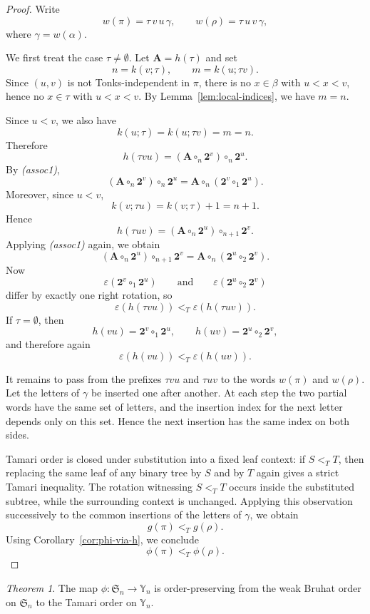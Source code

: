 \documentclass[a4paper]{article}
\theoremstyle{plain}
\theoremstyle{definition}
\theoremstyle{remark}
\numberwithin{equation}{section}
\newcommand{\Sym}{\mathfrak{S}}
\newcommand{\Y}{\mathbb{Y}}
\newcommand{\eval}{\varepsilon}
\newtheorem{theorem}{Theorem}[section]
\begin{document}
\begin{proof}
Write
\[
w(\pi)=\tau\,v\,u\,\gamma,
\qquad
w(\rho)=\tau\,u\,v\,\gamma,
\]
where \(\gamma=w(\alpha)\).

We first treat the case \(\tau\neq\emptyset\). Let $\mathbf A=h(\tau)$ and set
\[
n=k(v;\tau),
\qquad
m=k(u;\tau v).
\]
Since \((u,v)\) is not Tonks-independent in \(\pi\), there is no \(x\in\beta\) with
\(u<x<v\), hence no \(x\in\tau\) with \(u<x<v\). By
Lemma~\ref{lem:local-indices}, we have \(m=n\).

Since \(u<v\), we also have
\[
k(u;\tau)=k(u;\tau v)=m=n.
\]
Therefore
\[
h(\tau v u)=(\mathbf A\circ_n \mathbf 2^v)\circ_n \mathbf 2^u.
\]
By \emph{(assoc1)},
\[
(\mathbf A\circ_n \mathbf 2^v)\circ_n \mathbf 2^u
=
\mathbf A\circ_n(\mathbf 2^v\circ_1 \mathbf 2^u).
\]
Moreover, since \(u<v\),
\[
k(v;\tau u)=k(v;\tau)+1=n+1.
\]
Hence
\[
h(\tau u v)=(\mathbf A\circ_n \mathbf 2^u)\circ_{n+1}\mathbf 2^v.
\]
Applying \emph{(assoc1)} again, we obtain
\[
(\mathbf A\circ_n \mathbf 2^u)\circ_{n+1}\mathbf 2^v
=
\mathbf A\circ_n(\mathbf 2^u\circ_2 \mathbf 2^v).
\]
Now
\[
\eval(\mathbf 2^v\circ_1 \mathbf 2^u)
\qquad\text{and}\qquad
\eval(\mathbf 2^u\circ_2 \mathbf 2^v)
\]
differ by exactly one right rotation, so
\[
\eval(h(\tau v u))<_T \eval(h(\tau u v)).
\]
If \(\tau=\emptyset\), then
\[
h(vu)=\mathbf 2^v\circ_1 \mathbf 2^u,
\qquad
h(uv)=\mathbf 2^u\circ_2 \mathbf 2^v,
\]
and therefore again
\[
\eval(h(vu))<_T \eval(h(uv)).
\]

It remains to pass from the prefixes \(\tau vu\) and \(\tau uv\) to the
words \(w(\pi)\) and \(w(\rho)\). Let the letters of \(\gamma\) be inserted one
after another. At each step the two partial words have the same set of letters,
and the insertion index for the next letter depends only on this set. Hence
the next insertion has the same index on both sides.

Tamari order is closed under substitution into a fixed leaf context: if
\(S<_T T\), then replacing the same leaf of any binary tree by \(S\) and by
\(T\) again gives a strict Tamari inequality. The rotation witnessing
\(S<_T T\) occurs inside the substituted subtree, while the surrounding context
is unchanged. Applying this observation successively to the common insertions
of the letters of \(\gamma\), we obtain
\[
g(\pi)<_T g(\rho).
\]
Using Corollary~\ref{cor:phi-via-h}, we conclude
\[
\phi(\pi)<_T \phi(\rho).
\]
\end{proof}

\begin{theorem}\label{thm:order-preservation}
The map $\phi:\Sym_n\to\Y_n$ is order-preserving from the weak Bruhat order on \(\Sym_n\) to the Tamari order on \(\Y_n\).
\end{theorem}
\end{document}
